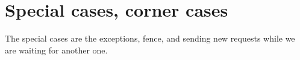 \section{Special cases, corner cases}

The special cases are the exceptions, fence, and sending new requests while we are waiting for another one. 
